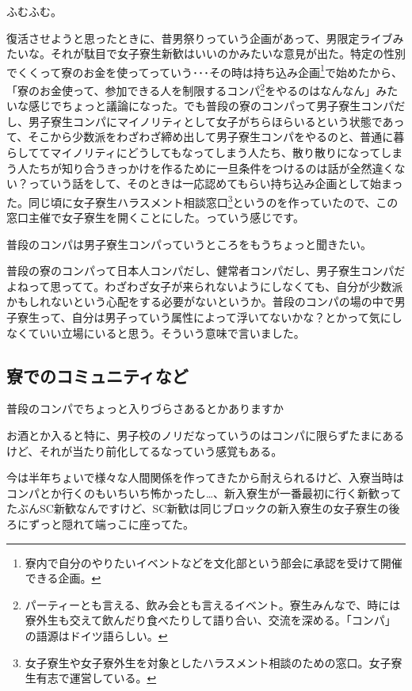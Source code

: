 \begin{multicols}{2}
  ふむふむ。

  復活させようと思ったときに、昔男祭りっていう企画があって、男限定ライブみたいな。それが駄目で女子寮生新歓はいいのかみたいな意見が出た。特定の性別でくくって寮のお金を使ってっていう･･･その時は持ち込み企画\footnote{寮内で自分のやりたいイベントなどを文化部という部会に承認を受けて開催できる企画。}で始めたから、「寮のお金使って、参加できる人を制限するコンパ\footnote{パーティーとも言える、飲み会とも言えるイベント。寮生みんなで、時には寮外生も交えて飲んだり食べたりして語り合い、交流を深める。「コンパ」の語源はドイツ語らしい。}をやるのはなんなん」みたいな感じでちょっと議論になった。でも普段の寮のコンパって男子寮生コンパだし、男子寮生コンパにマイノリティとして女子がちらほらいるという状態であって、そこから少数派をわざわざ締め出して男子寮生コンパをやるのと、普通に暮らしててマイノリティにどうしてもなってしまう人たち、散り散りになってしまう人たちが知り合うきっかけを作るために一旦条件をつけるのは話が全然違くない？っていう話をして、そのときは一応認めてもらい持ち込み企画として始まった。同じ頃に女子寮生ハラスメント相談窓口\footnote{ 女子寮生や女子寮外生を対象としたハラスメント相談のための窓口。女子寮生有志で運営している。}というのを作っていたので、この窓口主催で女子寮生を開くことにした。っていう感じです。

  普段のコンパは男子寮生コンパっていうところをもうちょっと聞きたい。

  普段の寮のコンパって日本人コンパだし、健常者コンパだし、男子寮生コンパだよねって思ってて。わざわざ女子が来られないようにしなくても、自分が少数派かもしれないという心配をする必要がないというか。普段のコンパの場の中で男子寮生って、自分は男子っていう属性によって浮いてないかな？とかって気にしなくていい立場にいると思う。そういう意味で言いました。





  \subsection{寮でのコミュニティなど}

  普段のコンパでちょっと入りづらさあるとかありますか

  お酒とか入ると特に、男子校のノリだなっていうのはコンパに限らずたまにあるけど、それが当たり前化してるなっていう感覚もある。

  今は半年ちょいで様々な人間関係を作ってきたから耐えられるけど、入寮当時はコンパとか行くのもいちいち怖かったし…、新入寮生が一番最初に行く新歓ってたぶんSC新歓なんですけど、SC新歓は同じブロックの新入寮生の女子寮生の後ろにずっと隠れて端っこに座ってた。


\end{multicols}
